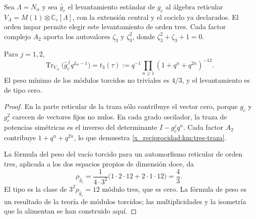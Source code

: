 Sea \(\Lambda=N_\alpha\) y sea \(\widehat g_c\) el levantamiento
estándar de \(g_c\) al álgebra reticular
\(V_\Lambda=M(1)\otimes\mathbb C_\varepsilon[\Lambda]\), con la
extensión central y el cociclo ya declarados. El orden impar permite
elegir este levantamiento de orden tres. Cada factor complejo \(A_2\)
aporta los autovalores \(\zeta_3\) y \(\zeta_3^2\), donde
\(\zeta_3^2+\zeta_3+1=0\).

\begin{proposition}
\label{x_reciprocidad:km:traza-tipo}
Para \(j=1,2\),
\begin{equation}
 \operatorname{Tr}_{V_\Lambda}
       \bigl(\widehat g_c^{\,j}q^{L_0-1}\bigr)
 =t_3(\tau)
 :=q^{-1}\prod_{n\ge1}(1+q^n+q^{2n})^{-12}.
 \label{x_reciprocidad:km:tres-traza}
\end{equation}
El peso mínimo de los módulos torcidos no triviales es \(4/3\), y
el levantamiento es de tipo cero.
\end{proposition}
\begin{proof}
En la parte reticular de la traza sólo contribuye el vector cero,
porque \(g_c\) y \(g_c^2\) carecen de vectores fijos no nulos.
En cada grado oscilador, la traza de potencias simétricas es el inverso
del determinante \(I-g_c^jq^n\). Cada factor \(A_2\) contribuye
\(1+q^n+q^{2n}\), lo que demuestra \eqref{x_reciprocidad:km:tres-traza}.

La fórmula del peso del vacío torcido para un automorfismo reticular de
orden tres, aplicada a los dos espacios propios de dimensión doce, da
\[
 \rho_{\widehat g_c}
 =\frac{1}{4\cdot3^2}
   \bigl(1\cdot2\cdot12+2\cdot1\cdot12\bigr)=\frac43.
\]
El tipo es la clase de \(3^2\rho_{\widehat g_c}=12\) módulo
tres, que es cero. La fórmula de peso es un resultado de la teoría de
módulos torcidos; las multiplicidades y la isometría que la alimentan
se han construido aquí.
\end{proof}

